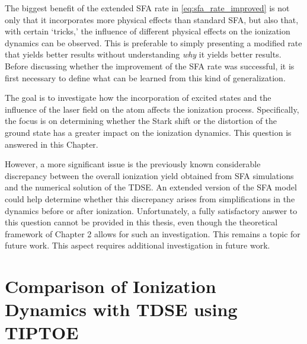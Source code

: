 The biggest benefit of the extended SFA rate in \eqref{eq:sfa_rate_improved} is not only that it incorporates more physical effects than standard SFA, but also that, with certain `tricks,’ the influence of different physical effects on the ionization dynamics can be observed. This is preferable to simply presenting a modified rate that yields better results without understanding \emph{why} it yields better results. Before discussing whether the improvement of the SFA rate was successful, it is first necessary to define what can be learned from this kind of generalization.

The goal is to investigate how the incorporation of excited states and the influence of the laser field on the atom affects the ionization process. Specifically, the focus is on determining whether the Stark shift or the distortion of the ground state has a greater impact on the ionization dynamics. This question is answered in this Chapter.

However, a more significant issue is the previously known considerable discrepancy between the overall ionization yield obtained from SFA simulations and the numerical solution of the TDSE. An extended version of the SFA model could help determine whether this discrepancy arises from simplifications in the dynamics before or after ionization. Unfortunately, a fully satisfactory answer to this question cannot be provided in this thesis, even though the theoretical framework of Chapter 2 allows for such an investigation. This remains a topic for future work. This aspect requires additional investigation in future work.








\section{Comparison of Ionization Dynamics with TDSE using TIPTOE}
